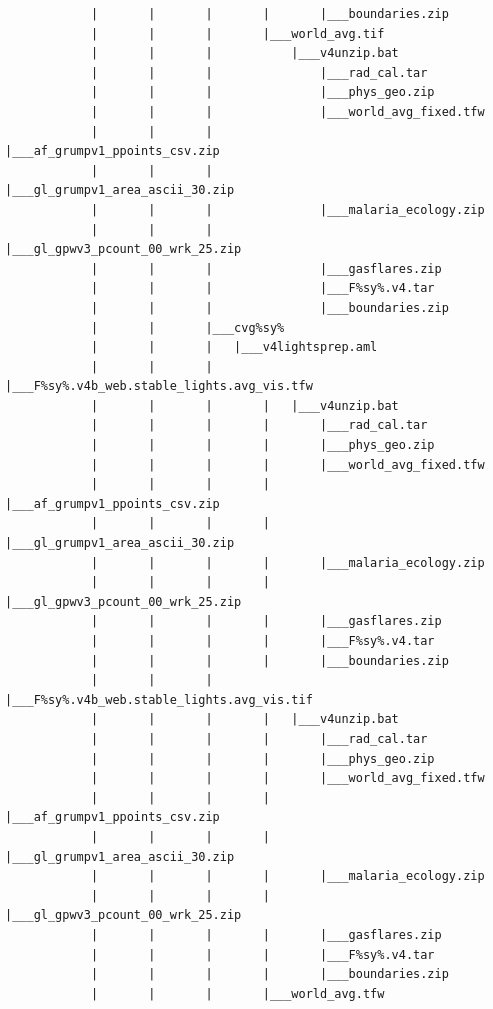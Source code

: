 \documentclass[
]{book}
\begin{document}
\begin{verbatim}
            |       |       |       |       |___boundaries.zip
            |       |       |       |___world_avg.tif
            |       |       |           |___v4unzip.bat
            |       |       |               |___rad_cal.tar
            |       |       |               |___phys_geo.zip
            |       |       |               |___world_avg_fixed.tfw
            |       |       |               |___af_grumpv1_ppoints_csv.zip
            |       |       |               |___gl_grumpv1_area_ascii_30.zip
            |       |       |               |___malaria_ecology.zip
            |       |       |               |___gl_gpwv3_pcount_00_wrk_25.zip
            |       |       |               |___gasflares.zip
            |       |       |               |___F%sy%.v4.tar
            |       |       |               |___boundaries.zip
            |       |       |___cvg%sy%
            |       |       |   |___v4lightsprep.aml
            |       |       |       |___F%sy%.v4b_web.stable_lights.avg_vis.tfw
            |       |       |       |   |___v4unzip.bat
            |       |       |       |       |___rad_cal.tar
            |       |       |       |       |___phys_geo.zip
            |       |       |       |       |___world_avg_fixed.tfw
            |       |       |       |       |___af_grumpv1_ppoints_csv.zip
            |       |       |       |       |___gl_grumpv1_area_ascii_30.zip
            |       |       |       |       |___malaria_ecology.zip
            |       |       |       |       |___gl_gpwv3_pcount_00_wrk_25.zip
            |       |       |       |       |___gasflares.zip
            |       |       |       |       |___F%sy%.v4.tar
            |       |       |       |       |___boundaries.zip
            |       |       |       |___F%sy%.v4b_web.stable_lights.avg_vis.tif
            |       |       |       |   |___v4unzip.bat
            |       |       |       |       |___rad_cal.tar
            |       |       |       |       |___phys_geo.zip
            |       |       |       |       |___world_avg_fixed.tfw
            |       |       |       |       |___af_grumpv1_ppoints_csv.zip
            |       |       |       |       |___gl_grumpv1_area_ascii_30.zip
            |       |       |       |       |___malaria_ecology.zip
            |       |       |       |       |___gl_gpwv3_pcount_00_wrk_25.zip
            |       |       |       |       |___gasflares.zip
            |       |       |       |       |___F%sy%.v4.tar
            |       |       |       |       |___boundaries.zip
            |       |       |       |___world_avg.tfw

\end{verbatim}
\end{document}
